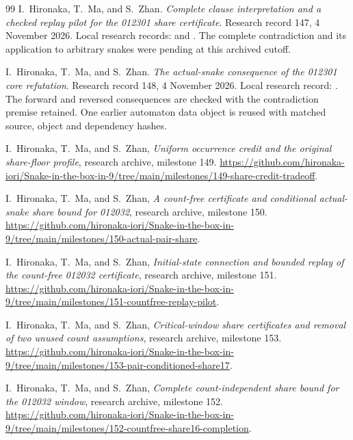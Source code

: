 \documentclass[11pt,a4paper]{article}
\theoremstyle{definition}
\theoremstyle{remark}
\begin{document}
\begin{thebibliography}{99}
I.~Hironaka, T.~Ma, and S.~Zhan. \emph{Complete clause interpretation and a
checked replay pilot for the 012301 share certificate}. Research record 147,
4 November 2026. Local research records:
and .
The complete contradiction and its application to arbitrary snakes were pending at this archived cutoff.

I.~Hironaka, T.~Ma, and S.~Zhan. \emph{The actual-snake consequence of the
012301 core refutation}. Research record 148, 4 November 2026.
Local research record:
.
The forward and reversed consequences are checked with the contradiction
premise retained. One earlier automaton data object is reused with matched
source, object and dependency hashes.

I.~Hironaka, T.~Ma, and S.~Zhan, \emph{Uniform occurrence credit and the
original share-floor profile}, research archive, milestone 149.
\url{https://github.com/hironaka-iori/Snake-in-the-box-in-9/tree/main/milestones/149-share-credit-tradeoff}.

I.~Hironaka, T.~Ma, and S.~Zhan, \emph{A count-free certificate and
conditional actual-snake share bound for 012032}, research archive,
milestone 150.
\url{https://github.com/hironaka-iori/Snake-in-the-box-in-9/tree/main/milestones/150-actual-pair-share}.

I.~Hironaka, T.~Ma, and S.~Zhan, \emph{Initial-state connection and bounded
replay of the count-free 012032 certificate}, research archive, milestone 151.
\url{https://github.com/hironaka-iori/Snake-in-the-box-in-9/tree/main/milestones/151-countfree-replay-pilot}.

I.~Hironaka, T.~Ma, and S.~Zhan, \emph{Critical-window share certificates
and removal of two unused count assumptions}, research archive, milestone 153.
\url{https://github.com/hironaka-iori/Snake-in-the-box-in-9/tree/main/milestones/153-pair-conditioned-share17}.

I.~Hironaka, T.~Ma, and S.~Zhan, \emph{Complete count-independent share
bound for the 012032 window}, research archive, milestone 152.
\url{https://github.com/hironaka-iori/Snake-in-the-box-in-9/tree/main/milestones/152-countfree-share16-completion}.


\end{thebibliography}
\end{document}
